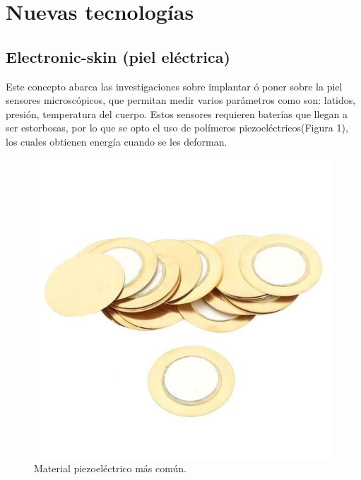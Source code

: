 \documentclass[journal, a4paper]{IEEEtran}
\begin{document}
\section{Nuevas tecnologías}
\subsection{Electronic-skin\citep{Nunez2019} (piel eléctrica)}
Este concepto abarca las investigaciones sobre implantar ó poner sobre la piel sensores microscópicos, que permitan medir varios parámetros como son: latidos, presión, temperatura del cuerpo. Estos sensores requieren baterías que llegan a ser estorbosas, por lo que se opto el uso de polímeros\citep{Nunez2019} piezoeléctricos(Figura 1), los cuales obtienen energía cuando se les deforman. 


\begin{figure}[H]
\centering
\includegraphics[scale=0.2]{figura1.jpg}
\caption{Material piezoeléctrico más común.}
\label{fig:figura1}
\end{figure}
\end{document}
